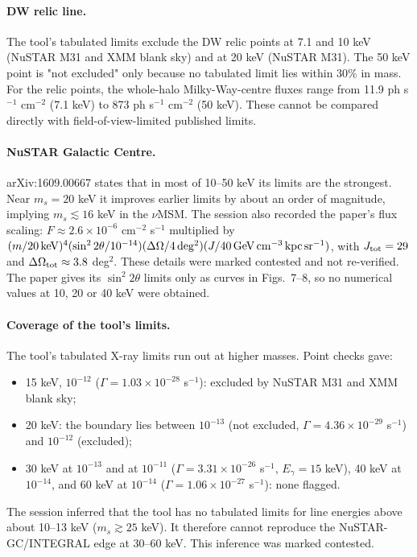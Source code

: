 \documentclass[11pt,a4paper]{article}
\begin{document}
\paragraph{DW relic line.} The tool's tabulated limits exclude the DW relic points at 7.1 and 10 keV (NuSTAR M31 and XMM blank sky) and at 20 keV (NuSTAR M31). The 50 keV point is "not excluded" only because no tabulated limit lies within 30\% in mass. For the relic points, the whole-halo Milky-Way-centre fluxes range from 11.9 ph s$^{-1}$ cm$^{-2}$ (7.1 keV) to 873 ph s$^{-1}$ cm$^{-2}$ (50 keV). These cannot be compared directly with field-of-view-limited published limits.

\paragraph{NuSTAR Galactic Centre.} arXiv:1609.00667 states that in most of 10--50 keV its limits are the strongest. Near $m_s=20$ keV it improves earlier limits by about an order of magnitude, implying $m_s\lesssim16$ keV in the $\nu$MSM. The session also recorded the paper's flux scaling: $F\approx2.6\times10^{-6}$ cm$^{-2}$ s$^{-1}$ multiplied by $(m/20\,{\rm keV})^4(\sin^2 2\theta/10^{-14})(\Delta\Omega/4\,{\rm deg^2})(J/40\,{\rm GeV\,cm^{-3}\,kpc\,sr^{-1}})$, with $J_{\rm tot}=29$ and $\Delta\Omega_{\rm tot}\approx3.8$ deg$^2$. These details were marked contested and not re-verified. The paper gives its $\sin^2 2\theta$ limits only as curves in Figs.~7--8, so no numerical values at 10, 20 or 40 keV were obtained.

\paragraph{Coverage of the tool's limits.} The tool's tabulated X-ray limits run out at higher masses. Point checks gave:
\begin{itemize}
\item 15 keV, $10^{-12}$ ($\Gamma=1.03\times10^{-28}$ s$^{-1}$): excluded by NuSTAR M31 and XMM blank sky;
\item 20 keV: the boundary lies between $10^{-13}$ (not excluded, $\Gamma=4.36\times10^{-29}$ s$^{-1}$) and $10^{-12}$ (excluded);
\item 30 keV at $10^{-13}$ and at $10^{-11}$ ($\Gamma=3.31\times10^{-26}$ s$^{-1}$, $E_\gamma=15$ keV), 40 keV at $10^{-14}$, and 60 keV at $10^{-14}$ ($\Gamma=1.06\times10^{-27}$ s$^{-1}$): none flagged.
\end{itemize}
The session inferred that the tool has no tabulated limits for line energies above about 10--13 keV ($m_s\gtrsim25$ keV). It therefore cannot reproduce the NuSTAR-GC/INTEGRAL edge at 30--60 keV. This inference was marked contested.
\end{document}
